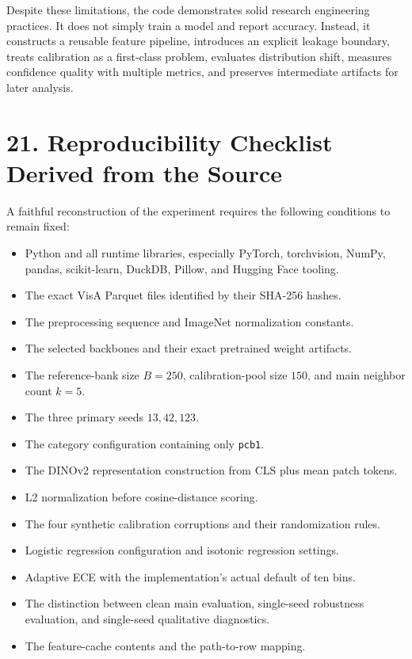 \documentclass[
  11pt,
]{article}
\providecommand{\tightlist}{%
  \setlength{\itemsep}{0pt}\setlength{\parskip}{0pt}}
\begin{document}
Despite these limitations, the code demonstrates solid research
engineering practices. It does not simply train a model
and report accuracy. Instead, it constructs a reusable feature pipeline,
introduces an explicit leakage boundary, treats calibration as a
first-class problem, evaluates distribution shift, measures confidence
quality with multiple metrics, and preserves intermediate artifacts for
later analysis.

\section{21. Reproducibility Checklist Derived from the
Source}\label{reproducibility-checklist-derived-from-the-source}

A faithful reconstruction of the experiment requires the following
conditions to remain fixed:

\begin{itemize}
\tightlist
\item
  Python and all runtime libraries, especially PyTorch, torchvision,
  NumPy, pandas, scikit-learn, DuckDB, Pillow, and Hugging Face tooling.
\item
  The exact VisA Parquet files identified by their SHA-256 hashes.
\item
  The preprocessing sequence and ImageNet normalization constants.
\item
  The selected backbones and their exact pretrained weight artifacts.
\item
  The reference-bank size \(B=250\), calibration-pool size \(150\), and
  main neighbor count \(k=5\).
\item
  The three primary seeds \(13,42,123\).
\item
  The category configuration containing only \texttt{pcb1}.
\item
  The DINOv2 representation construction from CLS plus mean patch
  tokens.
\item
  L2 normalization before cosine-distance scoring.
\item
  The four synthetic calibration corruptions and their randomization
  rules.
\item
  Logistic regression configuration and isotonic regression settings.
\item
  Adaptive ECE with the implementation's actual default of ten bins.
\item
  The distinction between clean main evaluation, single-seed robustness
  evaluation, and single-seed qualitative diagnostics.
\item
  The feature-cache contents and the path-to-row mapping.
\end{itemize}
\end{document}
